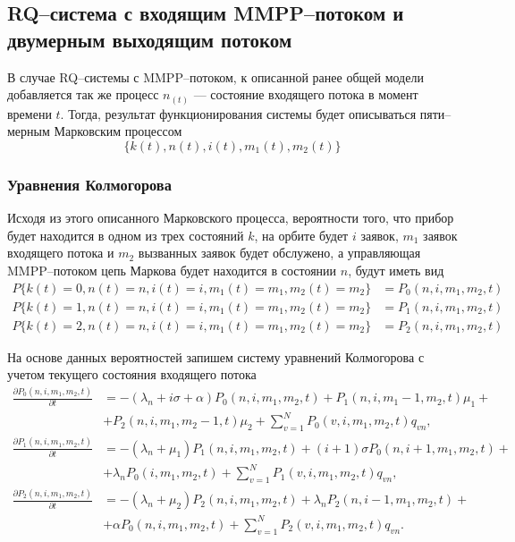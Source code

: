 \subsection{RQ--система с входящим MMPP--потоком и двумерным выходящим потоком} \label{section_map_twodim}
В случае RQ--системы с MMPP--потоком, к описанной ранее общей модели добавляется так же процесс $n_(t)$ --- состояние входящего потока в момент времени $t$. Тогда, результат функционирования системы будет описываться пяти--мерным Марковским процессом
\begin{equation*}
	\{k(t),n(t),i(t),m_{1}(t),m_{2}(t)\}
\end{equation*}

\subsubsection{Уравнения Колмогорова}

Исходя из этого описанного Марковского процесса, вероятности того, что прибор будет находится в одном из трех состояний $k$, на орбите будет $i$ заявок, $m_{1}$ заявок входящего потока и $m_{2}$ вызванных заявок будет обслужено, а управляющая MMPP--потоком цепь Маркова будет находится в состоянии $n$, будут иметь вид
\begin{equation*}
	\begin{split}
		P\{k(t)=0,n(t)=n,i(t)=i,m_{1}(t)=m_{1},m_{2}(t)=m_{2}\} &=P_{0}(n,i,m_{1},m_{2},t)\\
		P\{k(t)=1,n(t)=n,i(t)=i,m_{1}(t)=m_{1},m_{2}(t)=m_{2}\} &=P_{1}(n,i,m_{1},m_{2},t)\\
		P\{k(t)=2,n(t)=n,i(t)=i,m_{1}(t)=m_{1},m_{2}(t)=m_{2}\} &=P_{2}(n,i,m_{1},m_{2},t)
	\end{split}
\end{equation*} 

На основе данных вероятностей запишем систему уравнений Колмогорова с учетом текущего состояния входящего потока
\begin{equation} \label{kolmogorov_equations_twodim_map}
	\begin{split}
		\frac{{\partial P_{0}(n,i,m_{1},m_{2},t)}}{{\partial t}} &= -(\lambda_{n} + i\sigma + \alpha)P_{0}(n,i,m_{1},m_{2},t) + P_{1}(n,i,m_{1}-1,m_{2},t)\mu_{1} +\\  &+ P_{2}(n,i,m_{1},m_{2}-1,t)\mu_{2} + \sum_{v=1}^{N} P_{0}(v,i,m_{1},m_{2},t)q_{vn},
		\\
		\frac{{\partial P_{1}(n,i,m_{1},m_{2},t)}}{{\partial t}} &= -(\lambda_{n} + \mu_{1})P_{1}(n,i,m_{1},m_{2},t) + (i+1)\sigma P_{0}(n,i+1,m_{1},m_{2},t) +\\ &+ \lambda_{n}  P_{0}(i,m_{1},m_{2},t) + \sum_{v=1}^{N}P_{1}(v,i,m_{1},m_{2},t)q_{vn},
		\\
		\frac{{\partial P_{2}(n,i,m_{1},m_{2},t)}}{{\partial t}} &= -(\lambda_{n} + \mu_{2})P_{2}(n,i,m_{1},m_{2},t) + \lambda_{n} P_{2}(n,i-1,m_{1},m_{2},t)  +\\ &+ \alpha  P_{0}(n,i,m_{1},m_{2},t) +  \sum_{v=1}^{N}P_{2}(v,i,m_{1},m_{2},t)q_{vn}.
	\end{split}
\end{equation}	


